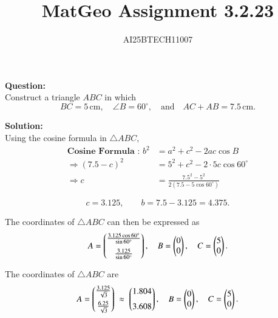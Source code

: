 \documentclass[journal]{IEEEtran}
\begin{document}

\vspace{3cm}

\title{MatGeo Assignment 3.2.23}
\author{AI25BTECH11007}
 \maketitle
{\let\newpage\relax\maketitle}

\renewcommand{\thefigure}{\theenumi}
\renewcommand{\thetable}{\theenumi}
\setlength{\intextsep}{10pt} %


\renewcommand{\thetable}{\theenumi}
\textbf{Question:}\\

Construct a triangle $ABC$ in which 
\[
BC = 5 \,\text{cm}, \quad \angle B = 60^\circ, \quad \text{and} \quad AC + AB = 7.5 \,\text{cm}.
\]


\textbf{Solution:}\\

Using the cosine formula in $\triangle ABC$,
\begin{align}
\textbf{Cosine Formula :   } 
    b^{2} &= a^{2} + c^{2} - 2ac\cos B \\
\Rightarrow (7.5-c)^{2} &= 5^{2} + c^{2} - 2\cdot 5c \cos 60^\circ \\
\Rightarrow c &= \frac{7.5^{2}-5^{2}}{2(7.5-5\cos 60^\circ)} 
\end{align}

\[
c = 3.125, 
\qquad b = 7.5 - 3.125 = 4.375.
\]

The coordinates of $\triangle ABC$ can then be expressed as
\[
A=\begin{pmatrix}\tfrac{3.125\cos 60^\circ}{\sin 60^\circ}\\[6pt]\tfrac{3.125}{\sin 60^\circ}\end{pmatrix},\quad 
B=\begin{pmatrix}0\\0\end{pmatrix},\quad 
C=\begin{pmatrix}5\\0\end{pmatrix}.
\]

The coordinates of $\triangle ABC$ are
\[
A=\begin{pmatrix}\tfrac{3.125}{\sqrt{3}} \\[6pt] \tfrac{6.25}{\sqrt{3}}\end{pmatrix}
\;\approx\;
\begin{pmatrix}1.804 \\[6pt] 3.608\end{pmatrix},\quad
B=\begin{pmatrix}0 \\ 0\end{pmatrix},\quad
C=\begin{pmatrix}5 \\ 0\end{pmatrix}.
\]
\end{document}

